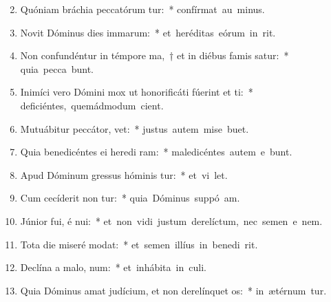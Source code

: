 \begin{flushleft}
\begin{enumerate}[leftmargin=*]
\setcounter{enumi}{1}

\item Quóniam bráchia peccatórum tur:~* \mbox{confírmat au  minus.}
\item Novit Dóminus dies immarum:~* \mbox{et heréditas eórum in  rit.}
\item Non confundéntur in témpore ma,~† et in diébus famis satur:~* \mbox{quia pecca bunt.}
\item Inimíci vero Dómini mox ut honorificáti fúerint et ti:~* \mbox{deficiéntes, quemádmodum  cient.}
\item Mutuábitur peccátor,   vet:~* \mbox{justus autem mise  buet.}
\item Quia benedicéntes ei heredi ram:~* \mbox{maledicéntes autem e bunt.}
\item Apud Dóminum gressus hóminis tur:~* \mbox{et vi  let.}
\item Cum cecíderit non tur:~* \mbox{quia Dóminus suppó  am.}
\item Júnior fui, é nui:~* \mbox{et non vidi justum derelíctum, nec semen e  nem.}
\item Tota die miseré  modat:~* \mbox{et semen illíus in benedi rit.}
\item Declína a malo,   num:~* \mbox{et inhábita in  culi.}
\item Quia Dóminus amat judícium, et non derelínquet  os:~* \mbox{in ætérnum tur.}

\end{enumerate}
\end{flushleft}
